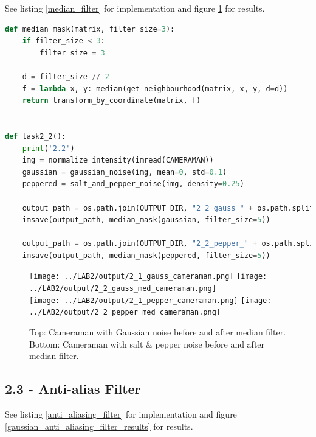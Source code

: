 See listing \ref{median_filter} for implementation and figure \ref{median_filter_results} for results.

\begin{lstlisting}[language=Python, label=median_filter, caption=Median Filter]
def median_mask(matrix, filter_size=3):
    if filter_size < 3:
        filter_size = 3

    d = filter_size // 2
    f = lambda x, y: median(get_neighbourhood(matrix, x, y, d=d))
    return transform_by_coordinate(matrix, f)


def task2_2():
    print('2.2')
    img = normalize_intensity(imread(CAMERAMAN))
    gaussian = gaussian_noise(img, mean=0, std=0.1)
    peppered = salt_and_pepper_noise(img, density=0.25)

    output_path = os.path.join(OUTPUT_DIR, "2_2_gauss_" + os.path.split(CAMERAMAN)[-1])
    imsave(output_path, median_mask(gaussian, filter_size=5))

    output_path = os.path.join(OUTPUT_DIR, "2_2_pepper_" + os.path.split(CAMERAMAN)[-1])
    imsave(output_path, median_mask(peppered, filter_size=5))
\end{lstlisting}


\begin{figure}[h!]
    \centering
    \texttt{[image: ../LAB2/output/2\_1\_gauss\_cameraman.png]}
    \texttt{[image: ../LAB2/output/2\_2\_gauss\_med\_cameraman.png]} \\
    \texttt{[image: ../LAB2/output/2\_1\_pepper\_cameraman.png]}
    \texttt{[image: ../LAB2/output/2\_2\_pepper\_med\_cameraman.png]}
    \caption{Top: Cameraman with Gaussian noise before and after median filter. \\ Bottom: Cameraman with salt \& pepper noise before and after median filter.}
    \label{median_filter_results}
\end{figure}


\newpage
\subsection*{2.3 - Anti-alias Filter}

See listing \ref{anti_aliasing_filter} for implementation and figure \ref{gaussian_anti_aliasing_filter_results} for results.

